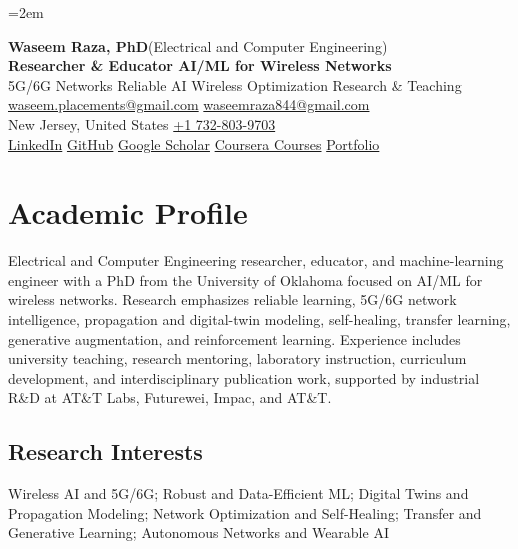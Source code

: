\documentclass[10pt,letterpaper]{extarticle}
\begin{document}
\emergencystretch=2em
\begin{center}
{\LARGE\bfseries Waseem Raza, PhD}{\normalsize\mdseries \enspace (Electrical and Computer Engineering)}\\[2pt]
{\large\bfseries Researcher \& Educator \textbar{} AI/ML for Wireless Networks}\\[1pt]
{\small 5G/6G Networks \textbar{} Reliable AI \textbar{} Wireless Optimization \textbar{} Research \& Teaching}\\[3pt]
{\footnotesize {}\enspace \href{mailto:waseem.placements@gmail.com}{waseem.placements@gmail.com} \textbar{} \href{mailto:waseemraza844@gmail.com}{waseemraza844@gmail.com}\\[1pt]New Jersey, United States \quad {}\enspace \href{tel:+17328039703}{+1 732-803-9703}\\[1pt]\href{https://www.linkedin.com/in/waseem-raza-phd-9a737858/}{LinkedIn} \textbar{} \href{https://github.com/WaseemRaza844}{GitHub} \textbar{} \href{https://scholar.google.com/citations?user=d58Drr0AAAAJ\&hl=en}{Google Scholar} \textbar{} \href{https://waseemraza844.github.io/portfolio/learning.html}{Coursera Courses} \textbar{} \href{https://waseemraza844.github.io/portfolio/}{Portfolio}}
\end{center}
\vspace{-5pt}
\section{Academic Profile}
Electrical and Computer Engineering researcher, educator, and machine-learning engineer with a PhD from the University of Oklahoma focused on AI/ML for wireless networks. Research emphasizes reliable learning, 5G/6G network intelligence, propagation and digital-twin modeling, self-healing, transfer learning, generative augmentation, and reinforcement learning. Experience includes university teaching, research mentoring, laboratory instruction, curriculum development, and interdisciplinary publication work, supported by industrial R\&D at AT\&T Labs, Futurewei, Impac, and AT\&T.
\subsection{Research Interests}
Wireless AI and 5G/6G; Robust and Data-Efficient ML; Digital Twins and Propagation Modeling; Network Optimization and Self-Healing; Transfer and Generative Learning; Autonomous Networks and Wearable AI\par
{}
\end{document}
